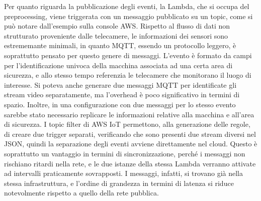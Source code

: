 
Per quanto riguarda la pubblicazione degli eventi, la Lambda, che si occupa del preprocessing, viene triggerata con un messaggio pubblicato su un topic, come si può notare dall'esempio sulla console AWS. Rispetto al flusso di dati non strutturato proveniente dalle telecamere, le informazioni dei sensori sono estrememante minimali, in quanto MQTT, essendo un protocollo leggero, è soprattutto pensato per questo genere di messaggi. L'evento è formato da campi per l'identificazione univoca della macchina associata ad una certa area di sicurezza, e allo stesso tempo referenzia le telecamere che monitorano il luogo di interesse. Si poteva anche generare due messaggi MQTT per identificate gli stream video separatamente, ma l'overhead è poco significativo in termini di spazio. Inoltre, in una configurazione con due messaggi per lo stesso evento sarebbe stato necessario replicare le informazioni relative alla macchina e all'area di sicurezza. I topic filter di AWS IoT permettono, alla generazione delle regole, di creare due trigger separati, verificando che sono presenti due stream diversi nel JSON, quindi la separazione degli eventi avviene direttamente nel cloud. Questo è soprattutto un vantaggio in termini di sincronizzazione, perché i messaggi non rischiano ritardi nella rete, e le due istanze della stessa Lambda verranno attivate ad intervalli praticamente sovrapposti. I messaggi, infatti, si trovano già nella stessa infrastruttura, e l'ordine di grandezza in termini di latenza si riduce notevolmente rispetto a quello della rete pubblica. %
